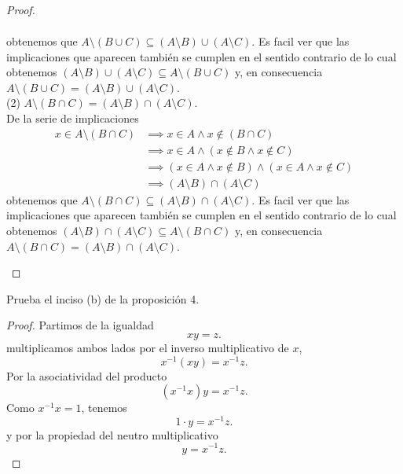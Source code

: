 \documentclass[12pt,a4paper]{article}
\begin{document}
\begin{proof}
\begin{enumerate}
\begin{align*}
            \end{align*}
            obtenemos que $A\setminus(B\cup C)\subseteq(A\setminus B)\cup(A\setminus C)$. Es facil ver que las implicaciones que aparecen también se cumplen en el
            sentido contrario de lo cual obtenemos $(A\setminus B)\cup(A\setminus C)\subseteq A\setminus(B\cup C)$ y, en consecuencia $A\setminus(B\cup C)=(A\setminus B)\cup(A\setminus C)$.\\
            (2) $A\setminus(B\cap C)=(A\setminus B)\cap (A\setminus C)$.\\
            De la serie de implicaciones
            \begin{align*}
                x\in A\setminus(B\cap C)&\implies x\in A\wedge x\notin (B\cap C)\\
                &\implies x\in A\wedge(x\notin B\wedge x\notin C)\\
                &\implies (x\in A\wedge x\notin B)\wedge(x\in A\wedge x\notin C)\\
                &\implies (A\setminus B)\cap(A\setminus C)
            \end{align*}
            obtenemos que $A\setminus(B\cap C)\subseteq(A\setminus B)\cap (A\setminus C)$. Es facil ver que las implicaciones que aparecen también se cumplen en el sentido
            contrario de lo cual obtenemos $(A\setminus B)\cap (A\setminus C)\subseteq A\setminus(B\cap C)$ y, en consecuencia $A\setminus(B\cap C)=(A\setminus B)\cap (A\setminus C)$.
        \end{enumerate}
    \end{proof}

    \begin{problema}
        Prueba el inciso (b) de la proposición 4.
    \end{problema}

    \begin{proof}
        Partimos de la igualdad
        \begin{equation*}
            xy=z.
        \end{equation*}
        multiplicamos ambos lados por el inverso multiplicativo de $x$,
        \begin{equation*}
            x^{-1}(xy)=x^{-1}z.
        \end{equation*}
        Por la asociatividad del producto
        \begin{equation*}
            (x^{-1}x)y=x^{-1}z.
        \end{equation*}
        Como $x^{-1}x=1$, tenemos
        \begin{equation*}
            1\cdot y=x^{-1}z.
        \end{equation*}
        y por la propiedad del neutro multiplicativo
        \begin{equation*}
            y=x^{-1}z.
        \end{equation*}
    \end{proof}
\end{document}
